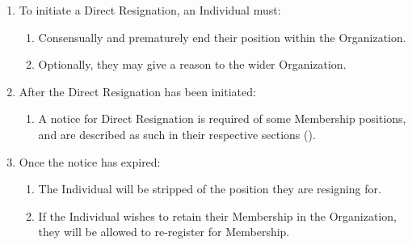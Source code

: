 \begin{enumerate}
	\item To initiate a Direct Resignation, an Individual must:
		\begin{enumerate}
			\item Consensually and prematurely end their position within the Organization.

			\item Optionally, they may give a reason to the wider Organization.
		\end{enumerate}

	\item After the Direct Resignation has been initiated:
		\begin{enumerate}
			\item A notice for Direct Resignation is required of some Membership positions,
				and are described as such in their respective sections ().
		\end{enumerate}

	\item Once the notice has expired:
		\begin{enumerate}
			\item The Individual will be stripped of the position they are resigning for.

			\item If the Individual wishes to retain their Membership in the Organization,
				they will be allowed to re-register for Membership.
		\end{enumerate}
\end{enumerate}

